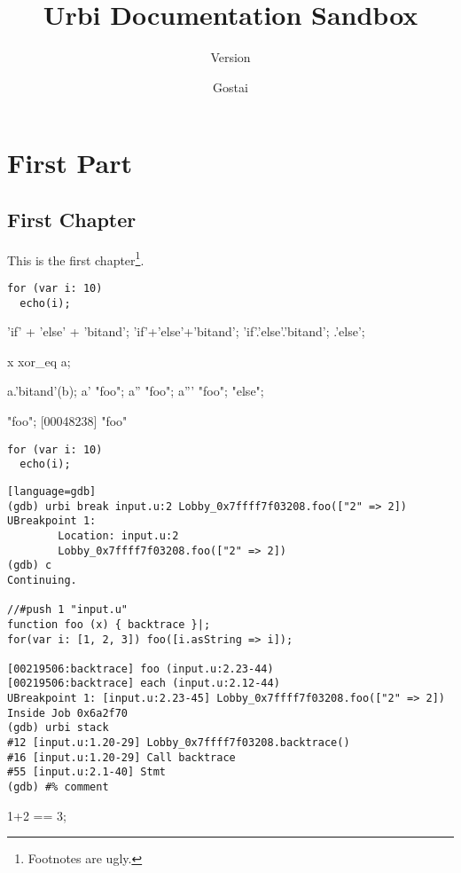 \documentclass[openright,twoside,11pt]{book}
\title{Urbi Documentation Sandbox}
\subtitle{Version \VcsDescription}
\author{Gostai}
\begin{document}
\maketitle

\tableofcontents
\part{First Part}

\chapter{First Chapter}

This is the first chapter\footnote{Footnotes are ugly.}.


\begin{verbatim}
for (var i: 10)
  echo(i);
\end{verbatim}

\begin{urbiunchecked}
'if' + 'else' + 'bitand';
'if'+'else'+'bitand';
'if'.'else'.'bitand';
.'else';

x xor_eq a;

a.'bitand'(b);
a' "foo";
a'' "foo";
a''' "foo";
"else";

"foo";
[00048238] "foo"
\end{urbiunchecked}

\grammar{}

\begin{verbatim}
for (var i: 10)
  echo(i);
\end{verbatim}

\begin{verbatim}[language=gdb]
(gdb) urbi break input.u:2 Lobby_0x7ffff7f03208.foo(["2" => 2])
UBreakpoint 1:
        Location: input.u:2
        Lobby_0x7ffff7f03208.foo(["2" => 2])
(gdb) c
Continuing.

//#push 1 "input.u"
function foo (x) { backtrace }|;
for(var i: [1, 2, 3]) foo([i.asString => i]);

[00219506:backtrace] foo (input.u:2.23-44)
[00219506:backtrace] each (input.u:2.12-44)
UBreakpoint 1: [input.u:2.23-45] Lobby_0x7ffff7f03208.foo(["2" => 2])
Inside Job 0x6a2f70
(gdb) urbi stack
#12 [input.u:1.20-29] Lobby_0x7ffff7f03208.backtrace()
#16 [input.u:1.20-29] Call backtrace
#55 [input.u:2.1-40] Stmt
(gdb) #% comment
\end{verbatim}


\begin{urbiassert}
1+2 == 3;
\end{urbiassert}
\end{document}
